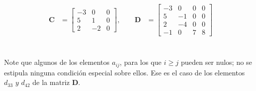 \documentclass[a4paper,12pt]{report} %
\begin{document}
\[
\begin{aligned}
\mathbf{C} &= \begin{bmatrix}
    -3 & 0 & 0 \\
    5 & 1 & 0 \\
    2 & -2 & 0
\end{bmatrix},
\qquad
\mathbf{D} &= \begin{bmatrix}
    -3 & 0 & 0 & 0\\
    5 & -1 & 0 & 0\\
    2 & -4 & 0 & 0\\
    -1 & 0 & 7 & 8
\end{bmatrix}
\end{aligned}
\]\\ \\
Note que algunos de los elementos \(\mathit{a_{ij}}\), para los que \(\mathit{i\geq j}\) pueden ser nulos; no se estipula ninguna condición especial sobre ellos. Ese es el caso de los elementos \(\mathit{d_{33}\text{ y }d_{42}}\) de la matriz \textbf{D}.
\\
\end{document}
